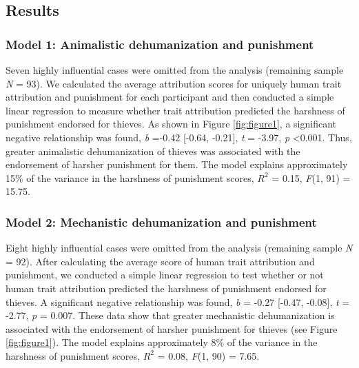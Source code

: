 \documentclass[
]{article}
\begin{document}
\hypertarget{results-1}{%
\subsection{Results}\label{results-1}}

\hypertarget{model-1-animalistic-dehumanization-and-punishment-1}{%
\subsubsection{Model 1: Animalistic dehumanization and punishment}\label{model-1-animalistic-dehumanization-and-punishment-1}}

Seven highly influential cases were omitted from the analysis (remaining sample \emph{N} = 93). We calculated the average attribution scores for uniquely human trait attribution and punishment for each participant and then conducted a simple linear regression to measure whether trait attribution predicted the harshness of punishment endorsed for thieves. As shown in Figure \ref{fig:figure1}, a significant negative relationship was found, \emph{b} =-0.42 {[}-0.64, -0.21{]}, \emph{t} = -3.97, \emph{p} \textless0.001. Thus, greater animalistic dehumanization of thieves was associated with the endorsement of harsher punishment for them. The model explains approximately 15\% of the variance in the harshness of punishment scores, \(R^2\) = 0.15, \emph{F}(1, 91) = 15.75.

\hypertarget{model-2-mechanistic-dehumanization-and-punishment-1}{%
\subsubsection{Model 2: Mechanistic dehumanization and punishment}\label{model-2-mechanistic-dehumanization-and-punishment-1}}

Eight highly influential cases were omitted from the analysis (remaining sample \emph{N} = 92). After calculating the average score of human trait attribution and punishment, we conducted a simple linear regression to test whether or not human trait attribution predicted the harshness of punishment endorsed for thieves. A significant negative relationship was found, \emph{b} = -0.27 {[}-0.47, -0.08{]}, \emph{t} = -2.77, \emph{p} = 0.007. These data show that greater mechanistic dehumanization is associated with the endorsement of harsher punishment for thieves (see Figure \ref{fig:figure1}). The model explains approximately 8\% of the variance in the harshness of punishment scores, \(R^2\) = 0.08, \emph{F}(1, 90) = 7.65.
\end{document}
